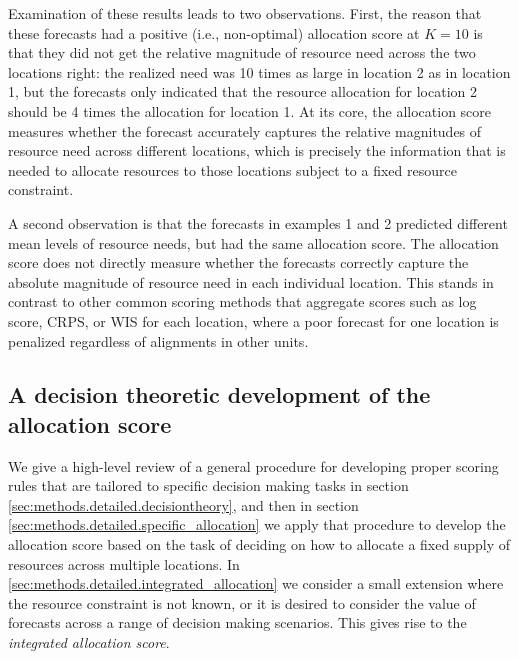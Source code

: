 \documentclass{article}\usepackage[]{graphicx}\usepackage[]{xcolor}
\begin{document}
Examination of these results leads to two observations. First, the reason that these forecasts had a positive (i.e.,
non-optimal) allocation score at $K=10$ is that they did not get the relative magnitude of resource need across the two
locations right: the realized need was 10 times as large in location 2 as in location 1, but the forecasts only
indicated that the resource allocation for location 2 should be 4 times the allocation for location 1. At its core, the
allocation score measures whether the forecast accurately captures the relative magnitudes of resource need across
different locations, which is precisely the information that is needed to allocate resources to those locations subject
to a fixed resource constraint.

A second observation is that the forecasts in examples 1 and 2 predicted different mean levels of resource needs, but
had the same allocation score. The allocation score does not directly measure whether the forecasts correctly capture
the absolute magnitude of resource need in each individual location. This stands in contrast to other common scoring
methods that aggregate scores such as log score, CRPS, or WIS for each location, where a poor forecast for one location
is penalized regardless of alignments in other units.

\subsection{A decision theoretic development of the allocation score}
\label{sec:methods.detailed}

We give a high-level review of a general procedure for developing proper scoring rules that are tailored to specific
decision making tasks in section \ref{sec:methods.detailed.decisiontheory}, and then in section
\ref{sec:methods.detailed.specific_allocation} we apply that procedure to develop the allocation score based on the task
of deciding on how to allocate a fixed supply of resources across multiple locations. In
\ref{sec:methods.detailed.integrated_allocation} we consider a small extension where the resource constraint is not
known, or it is desired to consider the value of forecasts across a range of decision making scenarios. This gives rise
to the \emph{integrated allocation score}.
\end{document}
